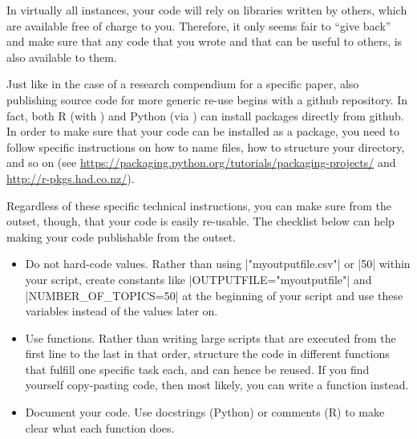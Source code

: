 In virtually all instances, your code will rely on libraries written
by others, which are available free of charge to you. Therefore,
it only seems fair to ``give back'' and make sure that any code that
you wrote and that can be useful to others, is also available to them.

Just like in the case of a research compendium for a specific paper,
also publishing source code for more generic re-use begins with a
github repository. In fact, both R (with ) and Python
(via ) can install packages directly from github. In order
to make sure that your code can be installed as a package, you
need to follow specific instructions on how to name files, how to
structure your directory, and so on (see \url{https://packaging.python.org/tutorials/packaging-projects/}
and \url{http://r-pkgs.had.co.nz/}).

Regardless of these specific technical instructions, you can make
sure from the outset, though, that your code is easily re-usable.
The checklist below can help making your code publishable from the
outset.

\begin{itemize}
\item Do not hard-code values. Rather than using |"myoutputfile.csv"| or |50| within your script, create constants like |OUTPUTFILE="myoutputfile"| and |NUMBER_OF_TOPICS=50| at the beginning of your script and use these variables instead of the values later on.
\item Use functions. Rather than writing large scripts that are executed from the first line to the last in that order, structure the code in different functions that fulfill one specific task each, and can hence be reused. If you find yourself copy-pasting code, then most likely, you can write a function instead.
\item Document your code. Use docstrings (Python) or comments (R) to make clear what each function does.
\end{itemize}

